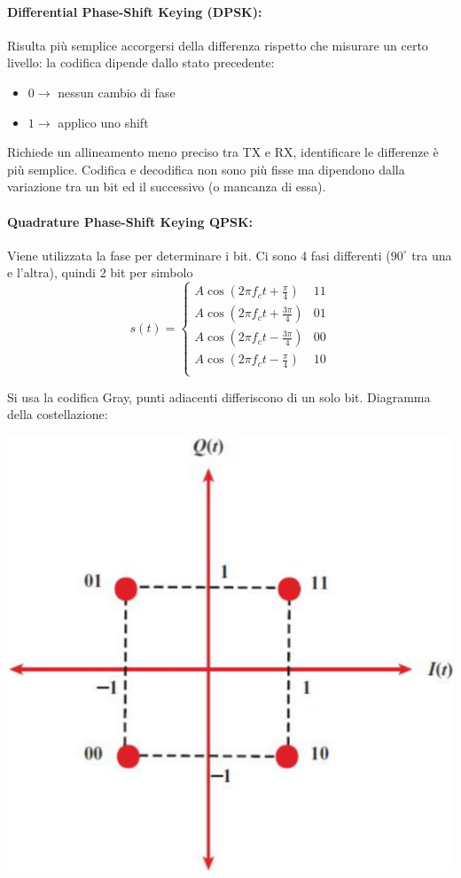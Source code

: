 \paragraph{Differential Phase-Shift Keying (DPSK):} Risulta più semplice accorgersi della differenza rispetto che misurare un certo livello: la codifica dipende dallo stato precedente: 
\begin{itemize}
	\item $0 \rightarrow$ nessun cambio di fase
	
    \item $1 \rightarrow$ applico uno shift
\end{itemize}

Richiede un allineamento meno preciso tra TX e RX, identificare le differenze è più semplice.  Codifica e decodifica non sono più fisse ma dipendono dalla variazione tra un bit ed il successivo (o mancanza di essa).

\paragraph{Quadrature Phase-Shift Keying QPSK:} Viene utilizzata la fase per determinare i bit. Ci sono 4 fasi differenti ($90^\circ$ tra una e l'altra), quindi 2 bit per simbolo
$$ s(t) = \begin{cases}
	A \cos \left(2 \pi f_c t + \frac{\pi}{4}\right) & 11 \\
	A \cos \left(2 \pi f_c t + \frac{3 \pi}{4}\right) & 01 \\
	A \cos \left(2 \pi f_c t - \frac{3 \pi}{4}\right) & 00 \\
	A \cos \left(2 \pi f_c t - \frac{\pi}{4}\right) & 10 \\
\end{cases} $$

Si usa la codifica Gray, punti adiacenti differiscono di un solo bit. Diagramma della costellazione:
\begin{center}
	\includegraphics[width=0.45\linewidth]{img/wireless/costellazione1}
\end{center}


